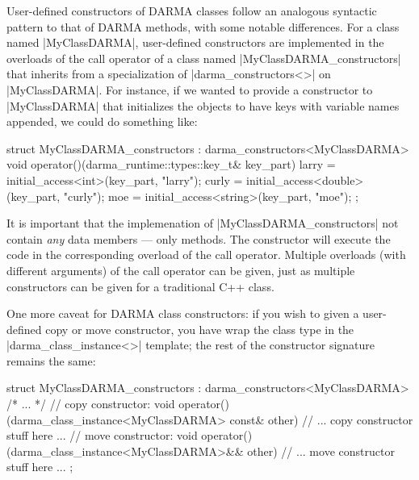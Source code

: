 User-defined constructors of DARMA classes follow an analogous syntactic pattern
to that of DARMA methods, with some notable differences.  For a class named
|MyClassDARMA|, user-defined constructors are implemented in the overloads
of the call operator of a class named |MyClassDARMA_constructors| that inherits
from a specialization of |darma_constructors<>| on |MyClassDARMA|.  For
instance, if we wanted to provide a constructor to |MyClassDARMA| that
initializes the \ahandleT objects to have keys with variable names appended, we
could do something like:
\begin{CppCodeNumb}
struct MyClassDARMA_constructors
  : darma_constructors<MyClassDARMA>
{
  void operator()(darma_runtime::types::key_t& key_part) {
    larry = initial_access<int>(key_part, "larry");
    curly = initial_access<double>(key_part, "curly");
    moe = initial_access<string>(key_part, "moe");
  }
};
\end{CppCodeNumb}
It is important that the implemenation of |MyClassDARMA_constructors|
not contain {\it any} data members --- only methods.  The constructor will
execute the code in the corresponding overload of the call operator.  Multiple
overloads (with different arguments) of the call operator can be given, just as
multiple constructors can be given for a traditional C++ class.

One more caveat for DARMA class constructors:  if you wish to given a
user-defined copy or move constructor, you have wrap the class type in the
|darma_class_instance<>| template; the rest of the constructor signature remains
the same:
\begin{CppCodeNumb}
struct MyClassDARMA_constructors
  : darma_constructors<MyClassDARMA>
{
  /* ... */
  // copy constructor:
  void operator()(darma_class_instance<MyClassDARMA> const& other) {
    // ... copy constructor stuff here ...
  }
  // move constructor:
  void operator()(darma_class_instance<MyClassDARMA>&& other) {
    // ... move constructor stuff here ...
  }
};
\end{CppCodeNumb}

\lstDeleteShortInline{\|}

 








